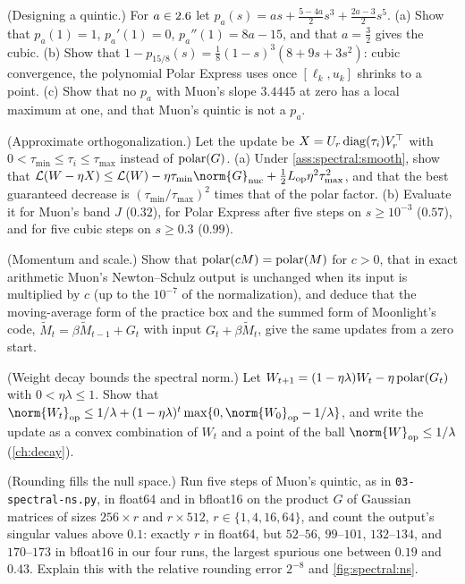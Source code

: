 \begin{refsection}
\begin{exercises}
\item \consolidation (Designing a quintic.) For $a\in2.6$ let $p_a(s)=as+\frac{5-4a}2s^3+\frac{2a-3}2s^5$. (a) Show that $p_a(1)=1$, $p_a'(1)=0$, $p_a''(1)=8a-15$, and that $a=\frac32$ gives the cubic. (b) Show that $1-p_{15/8}(s)=\frac18(1-s)^3(8+9s+3s^2)$: cubic convergence, the polynomial Polar Express uses once $[\ell_k,u_k]$ shrinks to a point. (c) Show that no $p_a$ with Muon's slope $3.4445$ at zero has a local maximum at one, and that Muon's quintic is not a $p_a$.\label{ex:spectral:quintic}

\item \variation (Approximate orthogonalization.) Let the update be $X=U_r\operatorname{diag}(\tau_i)V_r^\top$ with $0<\tau_{\min}\le\tau_i\le\tau_{\max}$ instead of $\operatorname{polar}(G)$. (a) Under \cref{ass:spectral:smooth}, show that $\Loss(W-\eta X)\le\Loss(W)-\eta\tau_{\min}\norm{G}_{\nuc}+\frac12L_{\op}\eta^2\tau_{\max}^2$, and that the best guaranteed decrease is $(\tau_{\min}/\tau_{\max})^2$ times that of the polar factor. (b) Evaluate it for Muon's band $J$ ($0.32$), for Polar Express after five steps on $s\ge10^{-3}$ ($0.57$), and for five cubic steps on $s\ge0.3$ ($0.99$).\label{ex:spectral:approx}

\item \variation (Momentum and scale.) Show that $\operatorname{polar}(cM)=\operatorname{polar}(M)$ for $c>0$, that in exact arithmetic Muon's Newton--Schulz output is unchanged when its input is multiplied by $c$ (up to the $10^{-7}$ of the normalization), and deduce that the moving-average form of the practice box and the summed form of Moonlight's code, $\tilde M_t=\beta\tilde M_{t-1}+G_t$ with input $G_t+\beta\tilde M_t$, give the same updates from a zero start.\label{ex:spectral:momentum}

\item \variation (Weight decay bounds the spectral norm.) Let $W_{t+1}=(1-\eta\lambda)W_t-\eta\operatorname{polar}(G_t)$ with $0<\eta\lambda\le1$. Show that $\norm{W_t}_{\op}\le1/\lambda+(1-\eta\lambda)^t\max\{0,\norm{W_0}_{\op}-1/\lambda\}$, and write the update as a convex combination of $W_t$ and a point of the ball $\norm{W}_{\op}\le1/\lambda$ (\cref{ch:decay}).\label{ex:spectral:decay}

\item \simulation (Rounding fills the null space.) Run five steps of Muon's quintic, as in \texttt{03-spectral-ns.py}, in float64 and in bfloat16 on the product $G$ of Gaussian matrices of sizes $256\times r$ and $r\times512$, $r\in\{1,4,16,64\}$, and count the output's singular values above $0.1$: exactly $r$ in float64, but $52$--$56$, $99$--$101$, $132$--$134$, and $170$--$173$ in bfloat16 in our four runs, the largest spurious one between $0.19$ and $0.43$. Explain this with the relative rounding error $2^{-8}$ and \cref{fig:spectral:ns}.\label{ex:spectral:bf16}


\end{exercises}
\end{refsection}
